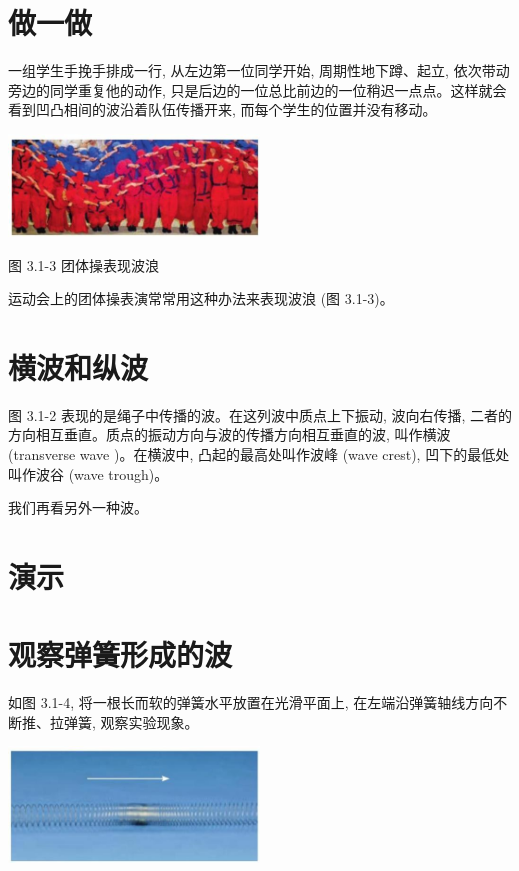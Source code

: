 \documentclass[10pt]{article}
\begin{document}
\section*{做一做}

一组学生手挽手排成一行, 从左边第一位同学开始, 周期性地下蹲、起立, 依次带动旁边的同学重复他的动作, 只是后边的一位总比前边的一位稍迟一点点。这样就会看到凹凸相间的波沿着队伍传播开来, 而每个学生的位置并没有移动。

\begin{center}
\includegraphics[max width=0.5\textwidth]{images/01910e4c-ebb8-7d2c-8f2f-2375bc1d2d12_68_942248.jpg}
\end{center}

图 3.1-3 团体操表现波浪

运动会上的团体操表演常常用这种办法来表现波浪 (图 3.1-3)。

\section*{横波和纵波}

图 3.1-2 表现的是绳子中传播的波。在这列波中质点上下振动, 波向右传播, 二者的方向相互垂直。质点的振动方向与波的传播方向相互垂直的波, 叫作横波 (transverse wave )。在横波中, 凸起的最高处叫作波峰 (wave crest), 凹下的最低处叫作波谷 (wave trough)。

我们再看另外一种波。

\section*{演示}

\section*{观察弹簧形成的波}

如图 3.1-4, 将一根长而软的弹簧水平放置在光滑平面上, 在左端沿弹簧轴线方向不断推、拉弹簧, 观察实验现象。

\begin{center}
\includegraphics[max width=0.5\textwidth]{images/01910e4c-ebb8-7d2c-8f2f-2375bc1d2d12_69_893278.jpg}
\end{center}
\end{document}
